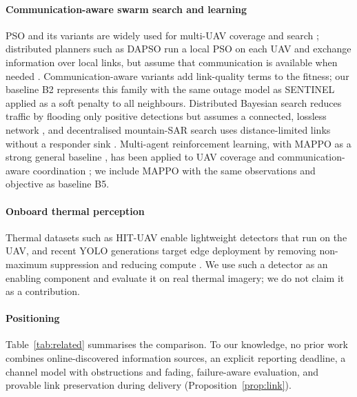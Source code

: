 \paragraph{Communication-aware swarm search and learning}
PSO and its variants are widely used for multi-UAV coverage and search \cite{clerc2002,phung2020mpso};
distributed planners such as DAPSO run a local PSO on each UAV and exchange information over local
links, but assume that communication is available when needed \cite{yang2024dapso}.
Communication-aware variants add link-quality terms to the fitness; our baseline B2 represents this
family with the same outage model as SENTINEL applied as a soft penalty to all neighbours. Distributed Bayesian search reduces
traffic by flooding only positive detections but assumes a connected, lossless network
\cite{niu2026eventbayes}, and decentralised mountain-SAR search uses distance-limited links without a
responder sink \cite{zhu2026mountain}. Multi-agent reinforcement learning, with MAPPO as a strong
general baseline \cite{yu2022mappo}, has been applied to UAV coverage and communication-aware
coordination \cite{shi2025symmetry}; we include MAPPO with the same observations and objective as
baseline B5.

\paragraph{Onboard thermal perception}
Thermal datasets such as HIT-UAV \cite{hituav} enable lightweight detectors that run on the UAV, and
recent YOLO generations target edge deployment by removing non-maximum suppression and reducing
compute \cite{yolo26}. We use such a detector as an enabling component and evaluate it on real
thermal imagery; we do not claim it as a contribution.

\paragraph{Positioning}
Table~\ref{tab:related} summarises the comparison. To our knowledge, no prior work combines
online-discovered information sources, an explicit reporting deadline, a channel model with
obstructions and fading, failure-aware evaluation, and provable link preservation during delivery
(Proposition~\ref{prop:link}).

